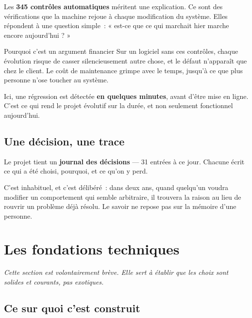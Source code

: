 \documentclass[11pt,a4paper]{article}
\begin{document}
Les \textbf{345 contrôles automatiques} méritent une explication. Ce sont des
vérifications que la machine rejoue à chaque modification du système. Elles
répondent à une question simple~: « est-ce que ce qui marchait hier marche
encore aujourd'hui ? »

\begin{encadre}{Pourquoi c'est un argument financier}
Sur un logiciel sans ces contrôles, chaque évolution risque de casser
silencieusement autre chose, et le défaut n'apparaît que chez le client. Le
coût de maintenance grimpe avec le temps, jusqu'à ce que plus personne n'ose
toucher au système.

Ici, une régression est détectée \textbf{en quelques minutes}, avant d'être
mise en ligne. C'est ce qui rend le projet évolutif sur la durée, et non
seulement fonctionnel aujourd'hui.
\end{encadre}

\subsection{Une décision, une trace}

Le projet tient un \textbf{journal des décisions} — 31 entrées à ce jour.
Chacune écrit ce qui a été choisi, pourquoi, et ce qu'on y perd.

C'est inhabituel, et c'est délibéré~: dans deux ans, quand quelqu'un voudra
modifier un comportement qui semble arbitraire, il trouvera la raison au lieu
de rouvrir un problème déjà résolu. Le savoir ne repose pas sur la mémoire
d'une personne.

\newpage
\section{Les fondations techniques}

\emph{Cette section est volontairement brève. Elle sert à établir que les
choix sont solides et courants, pas exotiques.}

\subsection{Ce sur quoi c'est construit}
\end{document}

